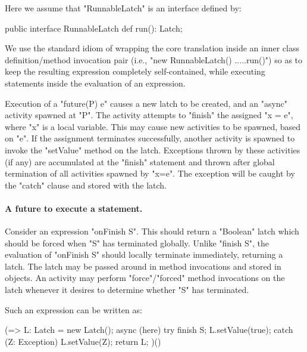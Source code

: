 {{Here we assume that \xcd"RunnableLatch" is an interface defined by:
\begin{xten} 
public interface RunnableLatch {
  def run(): Latch;
}
\end{xten}

We use the standard \java{} idiom of wrapping the core translation
inside an inner class definition/method invocation pair (i.e.,
\xcd"new RunnableLatch() {....}.run()") so as to keep the resulting
expression completely self-contained, while executing statements
inside the evaluation of an expression.

Execution of a \xcd"future(P) {e}" causes a new latch to be created,
and an \xcd"async" activity spawned at \xcd"P". The activity attempts
to \xcd"finish" the assigned \xcd"x = e", where \xcd"x" is a local
variable.  This may cause new activities to be spawned, based on
\xcd"e". If the assignment terminates successfully, another activity is
spawned to invoke the \xcd"setValue" method on the latch.  Exceptions
thrown by these activities (if any) are accumulated at the \xcd"finish"
statement and thrown after global termination of all
activities spawned by \xcd"x=e". The exception will be caught by the 
\xcd"catch" clause and stored with the latch. 



\paragraph{A future to execute a statement.}
Consider an expression \xcd"onFinish {S}". This should return
a \xcd"Boolean" latch which should be forced when \xcd"S" has terminated
globally. Unlike \xcd"finish S", the evaluation of \xcd"onFinish {S}"
should locally terminate immediately, returning a latch. The
latch may be passed around in method invocations and stored in
objects. An activity may perform \xcd"force"/\xcd"forced" method
invocations on the latch whenever it desires to determine whether \xcd"S"
has terminated.

Such an expression can be written as:
\begin{xten}
(=> {
    L: Latch = new Latch();
    async (here) {
      try {
        finish S;
        L.setValue(true);
      }
      catch (Z: Exception) {
        L.setValue(Z);
      }
    }
    return L;
  }
)()
\end{xten}
}

%

}
